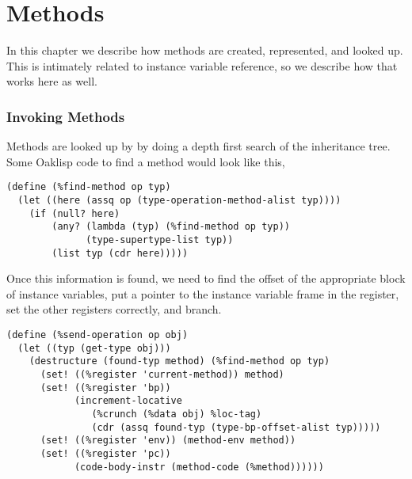 %
%
%


\chapter{Methods}

In this chapter we describe how methods are created, represented, and
looked up.  This is intimately related to instance variable reference,
so we describe how that works here as well.

\subsection{Invoking Methods}

Methods are looked up by by doing a depth first search of the
inheritance tree.  Some Oaklisp code to find a method would look like
this,
\begin{verbatim}
(define (%find-method op typ)
  (let ((here (assq op (type-operation-method-alist typ))))
    (if (null? here)
        (any? (lambda (typ) (%find-method op typ))
              (type-supertype-list typ))
        (list typ (cdr here)))))
\end{verbatim}
Once this information is found, we need to find the offset of the
appropriate block of instance variables, put a pointer to the instance
variable frame in the  register, set the other registers
correctly, and branch.
\begin{verbatim}
(define (%send-operation op obj)
  (let ((typ (get-type obj)))
    (destructure (found-typ method) (%find-method op typ)
      (set! ((%register 'current-method)) method)
      (set! ((%register 'bp))
            (increment-locative
               (%crunch (%data obj) %loc-tag)
               (cdr (assq found-typ (type-bp-offset-alist typ)))))
      (set! ((%register 'env)) (method-env method))
      (set! ((%register 'pc))
            (code-body-instr (method-code (%method))))))
\end{verbatim}

